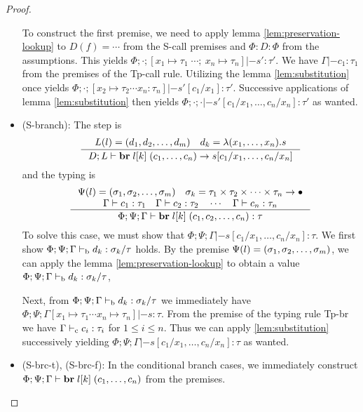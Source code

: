 \documentclass[a4paper, oneside, 10pt, draft]{memoir}
\begin{document}
\begin{proof}
\begin{itemize}
    To construct the first premise, we need to apply lemma
    \ref{lem:preservation-lookup} to $D(f) = \dotsb$ from the
    S-call premises and $\Phi : D : \Phi$ from the assumptions. This
    yields $\Phi;\cdot;[x_1 \mapsto \tau_1 \; \dotsb ;\ x_n \mapsto
    \tau_n] |- s' : \tau'$. We have $\Gamma |- c_1 : \tau_1$ from the
    premises of the Tp-call rule. Utilizing the lemma
    \ref{lem:substitution} once yields $\Phi;\cdot;[x_2 \mapsto \tau_2
    \dotsb x_n : \tau_n] |- s'[c_1/x_1] : \tau'$. Successive
    applications of lemma \ref{lem:substitution} then yields
    $\Phi;\cdot;\cdot |- s'[c_1/x_1,\dotsc,c_n/x_n] : \tau'$ as
    wanted.
  \item (S-branch):
    The step is
    \begin{equation*}
      \inference{L(l) = \dbundle \quad d_k = \lambda(x_1, \dotsc,
        x_n).s}
      {D;L |- \ibr{\lbl{k}}{(c_1, \dotsc, c_n)} -> s[c_1/x_1, \dotsc, c_n/x_n]}
    \end{equation*}
    and the typing is
    \begin{equation*}
      \inference{\Psi(l) = \bbtypes{} \quad \sigma_k =
        \ntypes -> \bullet\\
        \Gamma |- c_1 : \tau_1 \quad \Gamma |- c_2 : \tau_2 \quad \dotsb
        \quad \Gamma |- c_n : \tau_n}
      {\Phi;\Psi;\Gamma |- \ibr{\lbl{k}}(c_1, c_2, \dotsc, c_n) : \tau}
    \end{equation*}
    To solve this case, we must show that $\Phi;\Psi;\Gamma |-
    s[c_1/x_1,\dotsc,c_n/x_n] : \tau$. We first show $\Phi;\Psi;\Gamma
    |-_{\mathrm{b}} d_k : \sigma_k / \tau$ holds. By the premise $\Psi(l) =
    (\sigma_1, \sigma_2, \dotsc, \sigma_m)$, we can apply the lemma \ref{lem:preservation-lookup} to
    obtain a value $\Phi;\Psi;\Gamma |-_{\mathrm{b}} d_k : \sigma_k / \tau$,

    Next, from $\Phi;\Psi;\Gamma |-_{\mathrm{b}} d_k : \sigma_k / \tau$ we
    immediately have $\Phi;\Psi;\Gamma[x_1 \mapsto \tau_1 \dotsb x_n
    \mapsto \tau_n] |- s : \tau$. From the premise of the typing rule
    Tp-br we have $\Gamma |-_{\mathrm{c}} c_i : \tau_i$ for $1 \leq i \leq
    n$. Thus we can apply \ref{lem:substitution} successively yielding
    $\Phi;\Psi;\Gamma |- s[c_1/x_1,\dotsc,c_n/x_n] : \tau$ as wanted.
  \item (S-brc-t), (S-brc-f):
    In the conditional branch cases, we immediately construct
    $\Phi;\Psi;\Gamma |- \mathbf{br} \; l[k] \; (c_1, \dotsc, c_n)$ from the
    premises.
  \end{itemize}
\end{proof}
\end{document}

